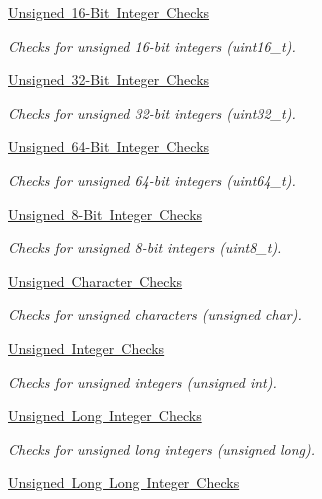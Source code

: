 \begin{DoxyCompactItemize}
\mbox{\hyperlink{group__RTEMSTestFrameworkChecksUInt16}{Unsigned 16-\/\+Bit Integer Checks}}
\begin{DoxyCompactList}\small\item\em Checks for unsigned 16-\/bit integers (uint16\+\_\+t). \end{DoxyCompactList}\item 
\mbox{\hyperlink{group__RTEMSTestFrameworkChecksUInt32}{Unsigned 32-\/\+Bit Integer Checks}}
\begin{DoxyCompactList}\small\item\em Checks for unsigned 32-\/bit integers (uint32\+\_\+t). \end{DoxyCompactList}\item 
\mbox{\hyperlink{group__RTEMSTestFrameworkChecksUInt64}{Unsigned 64-\/\+Bit Integer Checks}}
\begin{DoxyCompactList}\small\item\em Checks for unsigned 64-\/bit integers (uint64\+\_\+t). \end{DoxyCompactList}\item 
\mbox{\hyperlink{group__RTEMSTestFrameworkChecksUInt8}{Unsigned 8-\/\+Bit Integer Checks}}
\begin{DoxyCompactList}\small\item\em Checks for unsigned 8-\/bit integers (uint8\+\_\+t). \end{DoxyCompactList}\item 
\mbox{\hyperlink{group__RTEMSTestFrameworkChecksUChar}{Unsigned Character Checks}}
\begin{DoxyCompactList}\small\item\em Checks for unsigned characters (unsigned char). \end{DoxyCompactList}\item 
\mbox{\hyperlink{group__RTEMSTestFrameworkChecksUInt}{Unsigned Integer Checks}}
\begin{DoxyCompactList}\small\item\em Checks for unsigned integers (unsigned int). \end{DoxyCompactList}\item 
\mbox{\hyperlink{group__RTEMSTestFrameworkChecksULong}{Unsigned Long Integer Checks}}
\begin{DoxyCompactList}\small\item\em Checks for unsigned long integers (unsigned long). \end{DoxyCompactList}\item 
\mbox{\hyperlink{group__RTEMSTestFrameworkChecksULongLong}{Unsigned Long Long Integer Checks}}

\end{DoxyCompactItemize}
